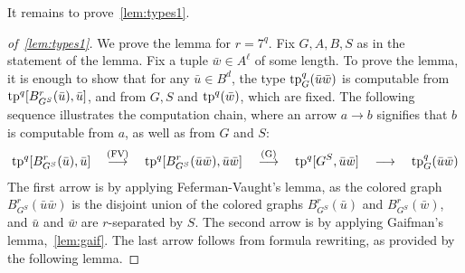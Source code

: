 It remains to prove~\cref{lem:types1}.




\begin{proof}[of~\cref{lem:types1}]
We prove the lemma for $r=7^q$. 
Fix $G,A,B,S$  as in the statement of the lemma.
Fix a tuple $\bar w\in A^\ell$ of some length.
To prove the lemma, it is enough to show that
for any   $\bar u\in B^d$,
the type
$\mathrm{tp}^q_G(\bar u\bar w)$ is computable from $\mathrm{tp}^q[B^r_{G^S}(\bar u), \bar u]$,
and from 
$G,S$ and $\mathrm{tp}^q(\bar w)$, which are fixed.
The following sequence illustrates the computation chain,
where an arrow $a\longrightarrow b$ signifies that $b$ is computable from $a$, as well as from $G$ and $S$:
\begin{align*}
	\mathrm{tp}^q[B^r_{G^S}(\bar u), \bar u]
  \quad\stackrel{\textrm{(FV)}}{\longrightarrow}\quad
	\mathrm{tp}^q[B^r_{G^S}(\bar u\bar w), \bar u\bar w] \quad\stackrel{\textrm{(G)}}\longrightarrow\quad
	\mathrm{tp}^q[G^S, \bar u\bar w] \quad\longrightarrow\quad
	\mathrm{tp}^q_G(\bar u\bar w)
\end{align*}
The first arrow is by applying Feferman-Vaught's lemma,
as the colored graph $B^r_{G^S}(\bar u\bar w)$
is the disjoint union of the colored graphs 
$B^r_{G^S}(\bar u)$ and $B^r_{G^S}(\bar w)$,
and $\bar u$ and $\bar w$ are $r$-separated by $S$.
The second arrow is by applying Gaifman's lemma,~\cref{lem:gaif}.
The last arrow follows from formula rewriting, as provided by the following lemma.


\end{proof}
